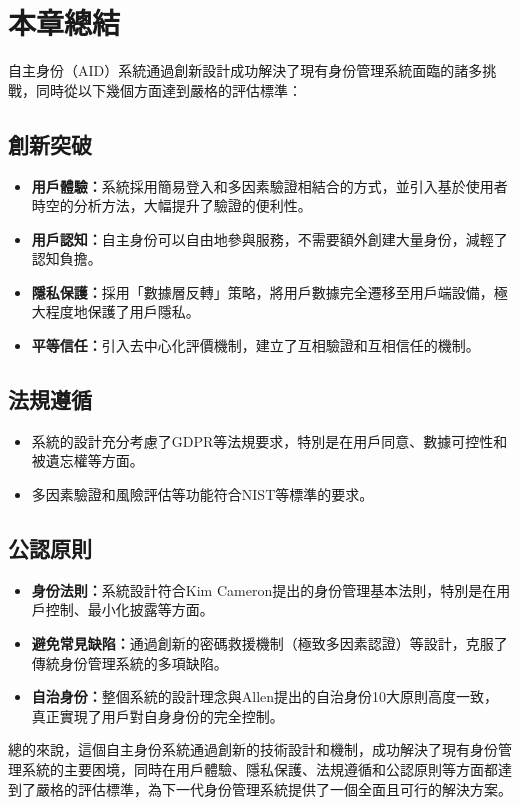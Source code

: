 \section{本章總結}
自主身份（AID）系統通過創新設計成功解決了現有身份管理系統面臨的諸多挑戰，同時從以下幾個方面達到嚴格的評估標準：
\subsection{創新突破}
\begin{itemize}
  \item \textbf{用戶體驗：}系統採用簡易登入和多因素驗證相結合的方式，並引入基於使用者時空的分析方法，大幅提升了驗證的便利性。
  \item \textbf{用戶認知：}自主身份可以自由地參與服務，不需要額外創建大量身份，減輕了認知負擔。
  \item \textbf{隱私保護：}採用「數據層反轉」策略，將用戶數據完全遷移至用戶端設備，極大程度地保護了用戶隱私。
  \item \textbf{平等信任：}引入去中心化評價機制，建立了互相驗證和互相信任的機制。
\end{itemize}
\subsection{法規遵循}
\begin{itemize}
  \item 系統的設計充分考慮了GDPR等法規要求，特別是在用戶同意、數據可控性和被遺忘權等方面。
  \item 多因素驗證和風險評估等功能符合NIST等標準的要求。
\end{itemize}
\subsection{公認原則}
\begin{itemize}
  \item \textbf{身份法則：}系統設計符合Kim Cameron提出的身份管理基本法則，特別是在用戶控制、最小化披露等方面。
  \item \textbf{避免常見缺陷：}通過創新的密碼救援機制（極致多因素認證）等設計，克服了傳統身份管理系統的多項缺陷。
  \item \textbf{自治身份：}整個系統的設計理念與Allen提出的自治身份10大原則高度一致，真正實現了用戶對自身身份的完全控制。
\end{itemize}
總的來說，這個自主身份系統通過創新的技術設計和機制，成功解決了現有身份管理系統的主要困境，同時在用戶體驗、隱私保護、法規遵循和公認原則等方面都達到了嚴格的評估標準，為下一代身份管理系統提供了一個全面且可行的解決方案。
